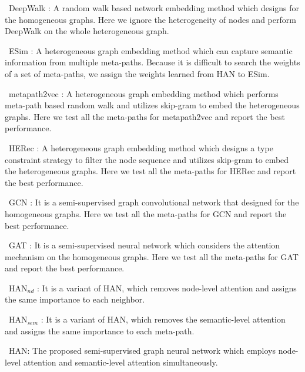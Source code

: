 \textbullet\  DeepWalk \cite{perozzi2014deepwalk}:
	A random walk based network embedding method which designs for the homogeneous graphs. 
	Here we ignore the heterogeneity of nodes and perform DeepWalk on the whole heterogeneous graph. 


\textbullet\   ESim \cite{Shang2016MetaPathGE}: 
	A 
heterogeneous graph embedding method which can capture semantic information from multiple meta-paths. 
	Because it is difficult to search the weights of a set of meta-paths, we assign the weights learned from HAN to ESim. 


\textbullet\  metapath2vec  \cite{Dong2017metapath2vecSR}: 
	A 
	heterogeneous graph
embedding method which performs meta-path based random walk and utilizes skip-gram to embed the heterogeneous graphs. 
Here we test all the meta-paths for metapath2vec and report the best performance.




\textbullet\  HERec \cite{HERec}:
	A heterogeneous graph embedding method which designs a type constraint strategy to filter the node sequence
and utilizes skip-gram to embed the heterogeneous graphs. 
Here we test all the meta-paths for HERec and report the best performance.




\textbullet\   GCN \cite{gcn}:
	It is a semi-supervised graph convolutional network that designed for the homogeneous graphs. 
Here we test all the meta-paths for GCN and report the best performance.
	


\textbullet\   GAT \cite{gat}:
	It is a semi-supervised neural network which considers the attention mechanism on the homogeneous graphs. 
Here we test all the meta-paths for GAT and report the best performance.
	


	
\textbullet\   HAN$_{nd}$  : 
	It is a variant of HAN, which removes node-level attention and assigns the same importance to each neighbor.


\textbullet\  HAN$_{sem}$  : 
	It is a variant of HAN, which removes the semantic-level attention and assigns  the same importance to each meta-path.


\textbullet\  HAN: 
The proposed semi-supervised graph neural network
which employs node-level attention and semantic-level attention simultaneously.
	









